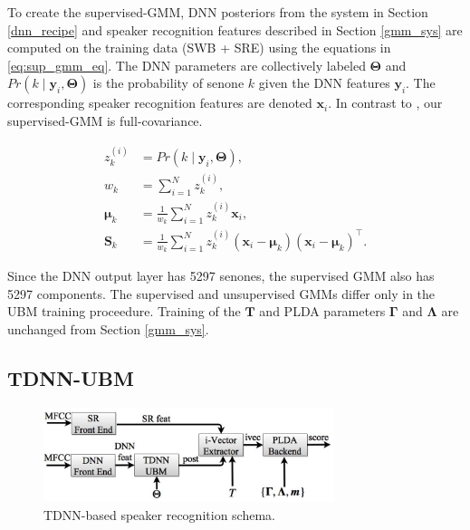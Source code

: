 \documentclass{article}
\begin{document}
To create the supervised-GMM, DNN posteriors from the system in Section \ref{dnn_recipe}
and speaker recognition
features described in Section \ref{gmm_sys} are computed on the training data (SWB + SRE)
 using the
equations in \ref{eq:sup_gmm_eq}. The DNN parameters are collectively
labeled $\boldsymbol{\Theta}$ and 
$Pr(k \mid \boldsymbol{y}_{i}, \boldsymbol{\Theta})$ is the
probability of senone $k$ given the DNN features $\boldsymbol{y}_{i}$. The
corresponding speaker recognition features are denoted $\boldsymbol{x}_{i}$.
In contrast to \cite{lei2014}, our supervised-GMM is full-covariance.

\begin{equation}
\label{eq:sup_gmm_eq} 
\begin{split}
z_{k}^{(i)} &= Pr(k \mid \boldsymbol{y}_{i}, \boldsymbol{\Theta}), \\
w_{k} &= \sum_{i=1}^{N}z_{k}^{(i)},\\
\boldsymbol{\mu}_{k} &= \frac{1}{w_{k}} \sum_{i=1}^{N} z_{k}^{(i)} \boldsymbol{x}_{i},\\
\boldsymbol{S}_{k} &= \frac{1}{w_{k}} \sum_{i=1}^{N} z_{k}^{(i)} (\boldsymbol{x}_{i} - \boldsymbol{\mu}_{k}) (\boldsymbol{x}_{i} - \boldsymbol{\mu}_{k})^{\top}.
\end{split}
\end{equation}

Since the DNN output layer has 5297 senones, the supervised GMM also has 5297
components. The supervised and unsupervised GMMs differ only
in the UBM training proceedure. Training of the $\boldsymbol{T}$ 
and PLDA parameters $\boldsymbol{\Gamma}$ and $\boldsymbol{\Lambda}$ are unchanged from Section \ref{gmm_sys}.

\subsection{TDNN-UBM}

\begin{figure}[th]
\centerline{\includegraphics[width=8.5cm]{fig/dnn_schema}}
\caption{TDNN-based speaker recognition schema.}
\label{fig:dnn_schema}
\end{figure}

\end{document}
